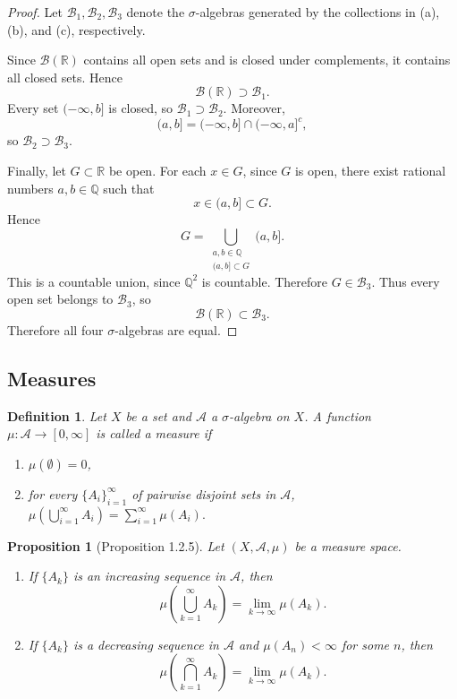 \documentclass[12pt]{article}
\newtheorem{definition}{Definition}
\newtheorem{proposition}{Proposition}
\begin{document}
\begin{proof}
Let $\mathcal{B}_1,\mathcal{B}_2,\mathcal{B}_3$ denote the $\sigma$-algebras
generated by the collections in (a), (b), and (c), respectively.

Since $\mathcal{B}(\mathbb{R})$ contains all open sets and is closed under
complements, it contains all closed sets. Hence
\[
\mathcal{B}(\mathbb{R}) \supset \mathcal{B}_1.
\]
Every set $(-\infty,b]$ is closed, so $\mathcal{B}_1 \supset \mathcal{B}_2$.
Moreover,
\[
(a,b] = (-\infty,b] \cap (-\infty,a]^c,
\]
so $\mathcal{B}_2 \supset \mathcal{B}_3$.

Finally, let $G \subset \mathbb{R}$ be open. For each $x \in G$, since $G$ is
open, there exist rational numbers $a,b \in \mathbb{Q}$ such that
\[
x \in (a,b] \subset G.
\]
Hence
\[
G = \bigcup_{\substack{a,b \in \mathbb{Q} \\ (a,b] \subset G}} (a,b].
\]
This is a countable union, since $\mathbb{Q}^2$ is countable. Therefore
$G \in \mathcal{B}_3$. Thus every open set belongs to $\mathcal{B}_3$, so
\[
\mathcal{B}(\mathbb{R}) \subset \mathcal{B}_3.
\]
Therefore all four $\sigma$-algebras are equal.
\end{proof}

\subsection*{Measures}

\begin{definition}
Let $X$ be a set and $\mathcal{A}$ a $\sigma$-algebra on $X$. A function
$\mu : \mathcal{A} \to [0,\infty]$ is called a \emph{measure} if
\begin{enumerate}[label=(\alph*)]
    \item $\mu(\emptyset) = 0$,
    \item for every $\{A_i\}_{i=1}^\infty$ of pairwise disjoint sets in $\mathcal{A}$,
    \(
    \mu\!\left(\bigcup_{i=1}^\infty A_i\right) = \sum_{i=1}^\infty \mu(A_i).
    \)
\end{enumerate}
\end{definition}

\begin{proposition}[Proposition 1.2.5]
Let $(X,\mathcal{A},\mu)$ be a measure space.
\begin{enumerate}[label=(\alph*)]
    \item If $\{A_k\}$ is an increasing sequence in $\mathcal{A}$, then
    \[
    \mu\!\left(\bigcup_{k=1}^\infty A_k\right) = \lim_{k \to \infty} \mu(A_k).
    \]
    \item If $\{A_k\}$ is a decreasing sequence in $\mathcal{A}$ and
    $\mu(A_n) < \infty$ for some $n$, then
    \[
    \mu\!\left(\bigcap_{k=1}^\infty A_k\right) = \lim_{k \to \infty} \mu(A_k).
    \]
\end{enumerate}
\end{proposition}
\end{document}
